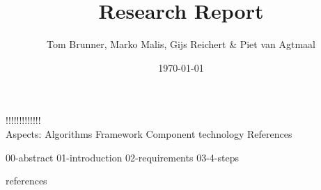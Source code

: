 

\title{Research Report}
\author{Tom Brunner, Marko Malis, Gijs Reichert \& Piet van Agtmaal}
\date{\today}



\maketitle

!!!!!!!!!!!!! \\
Aspects:
    Algorithms
    Framework
    Component technology
References

 {00-abstract}
 {01-introduction}
 {02-requirements}   
 {03-4-steps}

\appendix
 {references}




